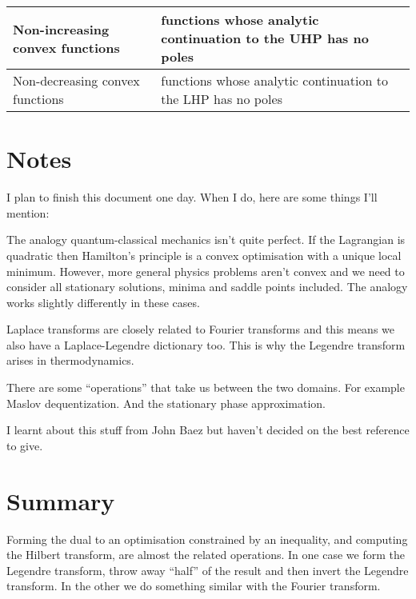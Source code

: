 \documentclass[10pt]{article}
\begin{document}
\begin{tabular}{| l | l |}
\hline

Non-increasing convex functions & functions whose analytic continuation to the UHP has no poles \\

\hline

Non-decreasing convex functions & functions whose analytic continuation to the LHP has no poles \\

\hline
\end{tabular}

\section{Notes}
I plan to finish this document one day.
When I do, here are some things I'll mention:

The analogy quantum-classical mechanics isn't quite perfect.
If the Lagrangian is quadratic then Hamilton's principle is a convex optimisation with a unique local minimum.
However, more general physics problems aren't convex and we need to consider all stationary solutions, minima and saddle points included.
The analogy works slightly differently in these cases.

Laplace transforms are closely related to Fourier transforms and this means we also have a Laplace-Legendre dictionary too.
This is why the Legendre transform arises in thermodynamics.

There are some ``operations'' that take us between the two domains.
For example Maslov dequentization.
And the stationary phase approximation.

I learnt about this stuff from John Baez but haven't decided on the best reference to give.

\section{Summary}
Forming the dual to an optimisation constrained by an inequality, and computing the Hilbert transform, are almost the related operations.
In one case we form the Legendre transform, throw away ``half'' of the result and then invert the Legendre transform.
In the other we do something similar with the Fourier transform.



\end{document}
